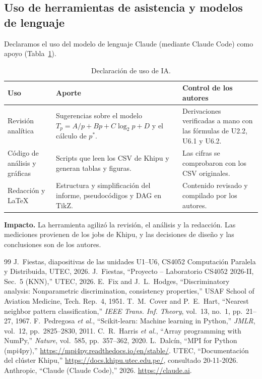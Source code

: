 \documentclass[11pt,a4paper]{article}
\begin{document}
\subsection{Uso de herramientas de asistencia y modelos de lenguaje}
Declaramos el uso del modelo de lenguaje Claude \cite{claude} (mediante Claude Code) como apoyo (Tabla~\ref{tab:ia}).

\begin{table}[H]
\centering\small
\caption{Declaración de uso de IA.}\label{tab:ia}
\begin{tabularx}{\linewidth}{@{}>{\raggedright\arraybackslash}p{3.1cm}>{\raggedright\arraybackslash}X>{\raggedright\arraybackslash}X@{}}\toprule
\textbf{Uso} & \textbf{Aporte} & \textbf{Control de los autores}\\\midrule
Revisión analítica & Sugerencias sobre el modelo $T_p=A/p+Bp+C\log_2p+D$ y el cálculo de $p^*$. & Derivaciones verificadas a mano con las fórmulas de U2.2, U6.1 y U6.2.\\\addlinespace
Código de análisis y gráficas & Scripts que leen los CSV de Khipu y generan tablas y figuras. & Las cifras se comprobaron con los CSV originales.\\\addlinespace
Redacción y \LaTeX & Estructura y simplificación del informe, pseudocódigos y DAG en TikZ. & Contenido revisado y compilado por los autores.\\\bottomrule
\end{tabularx}
\end{table}

\textbf{Impacto.} La herramienta agilizó la revisión, el análisis y la redacción. Las mediciones provienen de los jobs de Khipu, y las decisiones de diseño y las conclusiones son de los autores.

\begin{thebibliography}{99}\small
{} J.~Fiestas, diapositivas de las unidades U1--U6, CS4052 Computación Paralela y Distribuida, UTEC, 2026.
 J.~Fiestas, ``Proyecto -- Laboratorio CS4052 2026-II, Sec.~5 (KNN),'' UTEC, 2026.
 E.~Fix and J.~L.~Hodges, ``Discriminatory analysis: Nonparametric discrimination, consistency properties,'' USAF School of Aviation Medicine, Tech. Rep.~4, 1951.
 T.~M.~Cover and P.~E.~Hart, ``Nearest neighbor pattern classification,'' \emph{IEEE Trans. Inf. Theory}, vol.~13, no.~1, pp.~21--27, 1967.
 F.~Pedregosa \emph{et al.}, ``Scikit-learn: Machine learning in Python,'' \emph{JMLR}, vol.~12, pp.~2825--2830, 2011.
 C.~R.~Harris \emph{et al.}, ``Array programming with NumPy,'' \emph{Nature}, vol.~585, pp.~357--362, 2020.
 L.~Dalcín, ``MPI for Python (mpi4py),'' \url{https://mpi4py.readthedocs.io/en/stable/}.
 UTEC, ``Documentación del clúster Khipu,'' \url{https://docs.khipu.utec.edu.pe/}, consultado 20-11-2026.
 Anthropic, ``Claude (Claude Code),'' 2026. \url{https://claude.ai}.
\end{thebibliography}
\end{document}
